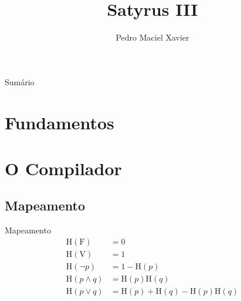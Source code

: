 \documentclass[brazil, MathSerif, aspectratio = 169]{beamer}
\author[Pedro Maciel]
{Pedro Maciel Xavier\break{\scriptsize sob orientação de Priscila Machado Vieira Lima}}
\title{Satyrus III}
\subtitle{\small }
\begin{document}
%
%

\begin{frame}[fragile]{Sumário}%
    \begin{multicols}{2}
        \tableofcontents
    \end{multicols}
\end{frame}


\hidelogo

\section{Fundamentos}
\SectionPage

\subsection{}
\begin{frame}{}
\end{frame}

\section{O Compilador}
\SectionPage

\subsection{Mapeamento}
\newcommand{\HH}[1]{\text{H}\left(#1\right)}
\begin{frame}{Mapeamento}
    \begin{align*}
        \HH{\text{F}}   & = 0                               \\
        \HH{\text{V}}   & = 1                               \\
        \HH{\neg p}     & = 1 - \HH{p}                      \\
        \HH{p \wedge q} & = \HH{p} \HH{q}                   \\
        \HH{p \vee q}   & = \HH{p} + \HH{q} - \HH{p} \HH{q}
    \end{align*}
\end{frame}
\end{document}
